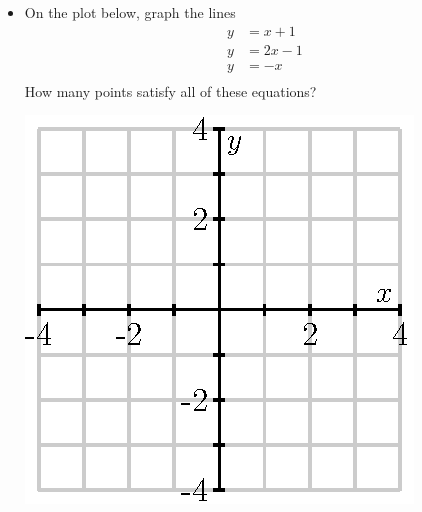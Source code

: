 \documentclass[12pt]{article}
\begin{document}
\begin{enumerate}
\begin{itemize}
\begin{center}
      \end{center}
    \item On the plot below, graph the lines
      $$
      \begin{aligned}
        y & = x + 1 \\
        y & = 2x - 1 \\
        y & = -x \\
      \end{aligned}
      $$
      How many points satisfy all of these equations?
      \begin{center}
        \includegraphics{empty-4.eps}
      \end{center}


\end{itemize}
\end{enumerate}
\end{document}
